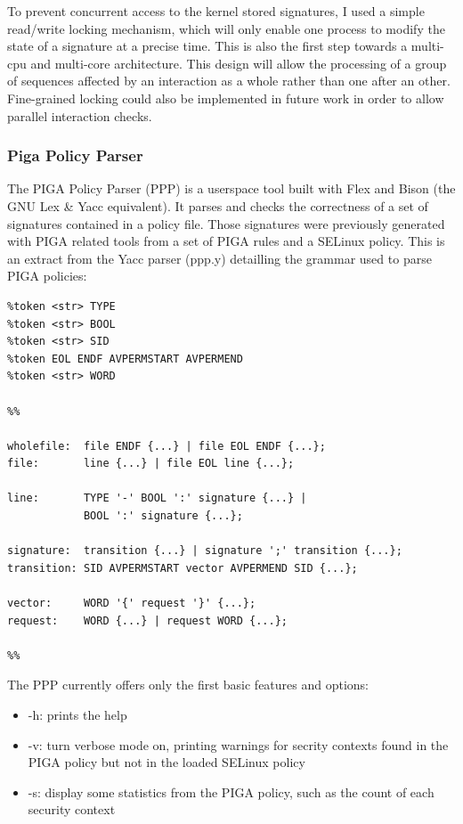 \documentclass[pdftex,a4paper,titlepage,11pt]{article}
\begin{document}
\medskip

To prevent concurrent access to the kernel stored signatures, I used a simple
read/write locking mechanism, which will only enable one process to modify the
state of a signature at a precise time. This is also the first step towards a
multi-cpu and multi-core architecture. This design will allow the processing of
a group of sequences affected by an interaction as a whole rather than one after
an other. Fine-grained locking could also be implemented in future work in order
to allow parallel interaction checks.

\subsubsection{Piga Policy Parser}

The PIGA Policy Parser (PPP) is a userspace tool built with Flex and Bison (the
GNU Lex \& Yacc equivalent). It parses and checks the correctness of a set of
signatures contained in a policy file. Those signatures were previously
generated with PIGA related tools from a set of PIGA rules and a SELinux policy.
This is an extract from the Yacc parser (ppp.y) detailling the grammar used to
parse PIGA policies:

\begin{lstlisting}
%token <str> TYPE
%token <str> BOOL
%token <str> SID
%token EOL ENDF AVPERMSTART AVPERMEND
%token <str> WORD

%%

wholefile:	file ENDF {...} | file EOL ENDF {...};
file:		line {...} | file EOL line {...};

line:		TYPE '-' BOOL ':' signature {...} |
			BOOL ':' signature {...};

signature:	transition {...} | signature ';' transition {...};
transition:	SID AVPERMSTART vector AVPERMEND SID {...};

vector:		WORD '{' request '}' {...};
request:	WORD {...} | request WORD {...};

%%
\end{lstlisting}

\medskip

The PPP currently offers only the first basic features and options:
\begin{itemize}
	\item -h: prints the help
	\item -v: turn verbose mode on, printing warnings for secrity contexts found
in the PIGA policy but not in the loaded SELinux policy
	\item -s: display some statistics from the PIGA policy, such as the count of
each security context
\end{itemize}
\end{document}
